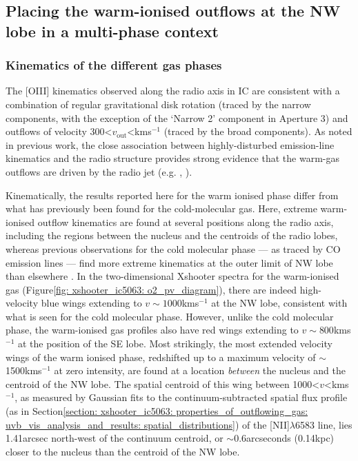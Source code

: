 \subsection{Placing the warm-ionised outflows at the NW lobe in a multi-phase context}
\label{section: xshooter_ic5063: discussion: multiphase}

\subsubsection{Kinematics of the different gas phases}
\label{section: xshooter_ic5063: discussion: multiphase: kinematics}

The [OIII] kinematics observed along the radio axis in IC are consistent with a combination of regular gravitational disk rotation (traced by the narrow components, with the exception of the `Narrow 2' component in Aperture 3) and outflows of velocity 300\;\textless\;$v_\mathrm{out}$\;\textless{}\;km\;s$^{-1}$ (traced by the broad components). As noted in previous work, the close association between highly-disturbed emission-line kinematics and the radio structure provides strong evidence that the warm-gas outflows are driven by the radio jet (e.g. \citealt{Morganti2007}, \citealt{Tadhunter2014}).

Kinematically, the results reported here for the warm ionised phase differ from what has previously been found for the cold-molecular gas. Here, extreme warm-ionised outflow kinematics are found at several positions along the radio axis, including the regions between the nucleus and the centroids of the radio lobes, whereas previous observations for the cold molecular phase --- as traced by CO emission lines --- find more extreme kinematics at the outer limit of NW lobe than elsewhere \citep{Morganti2015, Oosterloo2017}. In the two-dimensional Xshooter spectra for the warm-ionised gas (Figure\;\ref{fig: xshooter_ic5063: o2_pv_diagram}), there are indeed high-velocity blue wings extending to $v\sim1000$\;km\;s$^{-1}$ at the NW lobe, consistent with what is seen for the cold molecular phase. However, unlike the cold molecular phase, the warm-ionised gas profiles also have red wings extending to $v\sim800$\;km\;s$^{-1}$ at the position of the SE lobe. Most strikingly, the most extended velocity wings of the warm ionised phase, redshifted up to a maximum velocity of $\sim$1500\;km\;s$^{-1}$ at zero intensity, are found at a location \textit{between} the nucleus and the centroid of the NW lobe. The spatial centroid of this wing between \mbox{1000\;\textless\;$v$\;\textless{}\;km\;s$^{-1}$}, as measured by Gaussian fits to the continuum-subtracted spatial flux profile (as in Section\;\ref{section: xshooter_ic5063: properties_of_outflowing_gas: uvb_vis_analysis_and_results: spatial_distributions}) of the [NII]$\lambda$6583 line, lies 1.41\;arcsec north-west of the continuum centroid, or $\sim$0.6\;arcseconds (0.14\;kpc) closer to the nucleus than the centroid of the NW lobe.

